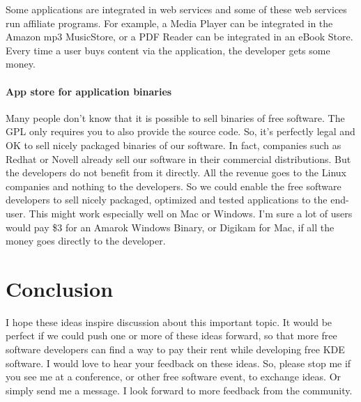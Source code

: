 Some applications are integrated in web services and some of these web services run affiliate programs. For example, a Media Player can be integrated in the Amazon mp3 MusicStore, or a PDF Reader can be integrated in an eBook Store. Every time a user buys content via the application, the developer gets some money.

\paragraph*{App store for application binaries}

Many people don't know that it is possible to sell binaries of free software. The GPL only requires you to also provide the source code. So, it's perfectly legal and OK to sell nicely packaged binaries of our software. In fact, companies such as Redhat or Novell already sell our software in their commercial distributions. But the developers do not benefit from it directly. All the revenue goes to the Linux companies and nothing to the developers. So we could enable the free software developers to sell nicely packaged, optimized and tested applications to the end-user. This might work especially well on Mac or Windows. I'm sure a lot of users would pay \$3 for an Amarok Windows Binary, or Digikam for Mac, if all the money goes directly to the developer.

\section*{Conclusion}

I hope  these ideas inspire discussion about this important topic. It would be perfect if we could push one or more of these ideas forward, so that more free software developers can find a way to pay their rent while developing free KDE software.
I would love to hear your feedback on these ideas. So, please stop me if you see me at a conference, or other free software event, to exchange ideas. Or simply send me a message. I look forward to more feedback from the community.
